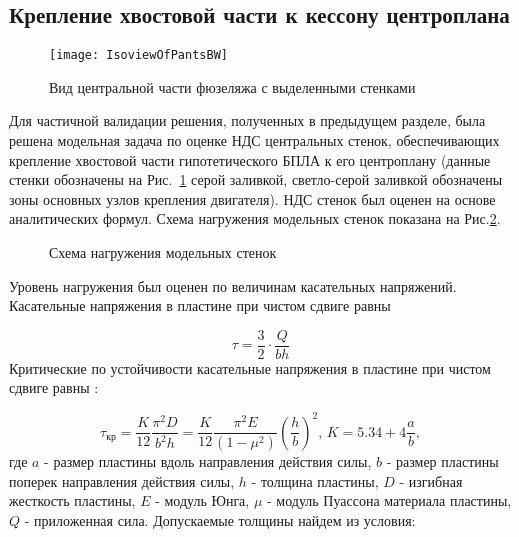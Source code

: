  \subsection{Крепление хвостовой части к кессону центроплана} 
\label{sec:pants}
\begin{figure}[H]
\centering
\texttt{[image: IsoviewOfPantsBW]}
\caption{Вид центральной части фюзеляжа с выделенными стенками}
\label{fig:IsoviewOfPants}
\end{figure}


Для частичной валидации решения, полученных в предыдущем разделе, была решена модельная задача по оценке НДС центральных стенок, обеспечивающих крепление хвостовой части гипотетического БПЛА к его центроплану (данные стенки обозначены на Рис.~\ref{fig:IsoviewOfPants} серой заливкой, светло-серой заливкой обозначены зоны основных узлов крепления двигателя). НДС стенок был оценен на основе аналитических формул. Схема нагружения модельных стенок показана на Рис.\ref{fig:IsoviewOfPantsModel}.

\begin{figure}[H]
\centering

\caption{Схема нагружения модельных стенок}
\label{fig:IsoviewOfPantsModel}
\end{figure}

%


Уровень нагружения был оценен по величинам касательных напряжений. Касательные напряжения в пластине при чистом сдвиге равны

\begin{equation}
\tau=\frac{3}{2}\cdot\frac{Q}{bh}
\end{equation}
Критические по устойчивости касательные напряжения в пластине при чистом сдвиге равны \cite{Volmir}:

\begin{equation}
\tau_\text{кр}=\frac{K}{12}\frac{\pi^2D}{b^2h} = \frac{K}{12}\frac{\pi^2E}{(1-\mu^2)}\left(\frac{h}{b}\right)^2,\, K=5.34 + 4\frac{a}{b},
\end{equation}
где $a$ - размер пластины вдоль направления действия силы, $b$ - размер пластины поперек направления действия силы, $h$ - толщина пластины, $D$ - изгибная жесткость пластины, $E$ - модуль Юнга, $\mu$ - модуль Пуассона материала пластины, $Q$ - приложенная сила.
Допускаемые толщины найдем из условия:

